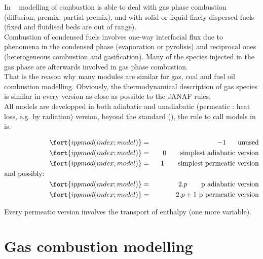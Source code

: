 In \CS~ modelling of combustion is able to deal with gas phase combustion
(diffusion, premix, partial premix), and with solid or liquid finely dispersed
fuels (fixed and fluidised beds are out of range).\\
Combustion of condensed fuels involves one-way interfacial flux due to phenomena
in the condensed phase (evaporation or pyrolisis) and reciprocal ones
(heterogeneous combustion and gasification). Many of the species injected in the
gas phase are afterwards involved in
gas phase combustion.\\
That is the reason why many modules are similar for gas, coal and fuel oil
combustion modelling. Obviously, the thermodynamical description of gas
species is similar in every version as close as possible to the JANAF rules.\\
All models are developped in both adiabatic and unadiabatic (permeatic : heat
loss, e.g. by radiation) version, beyond the standard (), the
rule to call models in  is:

\begin{eqnarray}
\fort{ippmod(index ; model)}  &=&     -1   ~~\quad \text{unused}                     \nonumber \\
\fort{ippmod(index ; model)}  &=& ~~   0  ~~~\quad \text{simplest adiabatic version} \nonumber \\
\fort{ippmod(index ; model)}  &=& ~~  1  ~~~\quad \text{simplest permeatic version}  \label{Eqs_00A}\\
\text{and possibly:}\qquad\qquad\qquad\qquad\qquad\qquad\qquad \nonumber & &\\
\fort{ippmod(index ; model)}  &=&  2.p    \qquad \text{p} ~\text{adiabatic version}  \nonumber \\
\fort{ippmod(index ; model)}  &=&  2.p+1 ~       \text{p} ~\text{permeatic version}  \nonumber
\end{eqnarray}


Every permeatic version involves the transport of enthalpy (one more variable).

\section{Gas combustion modelling}

